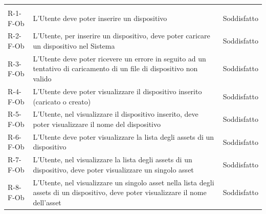\documentclass[a4paper,12pt]{article}
\begin{document}
{{\begin{longtable}{|l|p{}|p{}|}
                \hline
                \rowcolor{white}
                \multicolumn{3}{r}{\textit{continua nella pagina successiva...}} \\
                \endfoot                                                                  

                \hline
                \endlastfoot

                R-1-F-Ob        & L'Utente deve poter inserire un dispositivo                                                                                                                                                 & Soddisfatto \\ \hline
                R-2-F-Ob        & L'Utente, per inserire un dispositivo, deve poter caricare un dispositivo nel Sistema                                                                                                       & Soddisfatto \\ \hline
                R-3-F-Ob        & L'Utente deve poter ricevere un errore in seguito ad un tentativo di caricamento di un file di dispositivo non valido                                                                       & Soddisfatto \\ \hline
                R-4-F-Ob        & L'Utente deve poter visualizzare il dispositivo inserito (caricato o creato)                                                                                                                & Soddisfatto \\ \hline
                R-5-F-Ob        & L'Utente, nel visualizzare il dispositivo inserito, deve poter visualizzare il nome del dispositivo                                                                                         & Soddisfatto \\ \hline
                R-6-F-Ob        & L'Utente deve poter visualizzare la lista degli assets di un dispositivo                                                                                                                    & Soddisfatto \\ \hline
                R-7-F-Ob        & L'Utente, nel visualizzare la lista degli assets di un dispositivo, deve poter visualizzare un singolo asset                                                                                & Soddisfatto \\ \hline
                R-8-F-Ob        & L'Utente, nel visualizzare un singolo asset nella lista degli assets di un dispositivo, deve poter visualizzare il nome dell'asset                                                          & Soddisfatto \\ \hline

\end{longtable}}}
\end{document}

